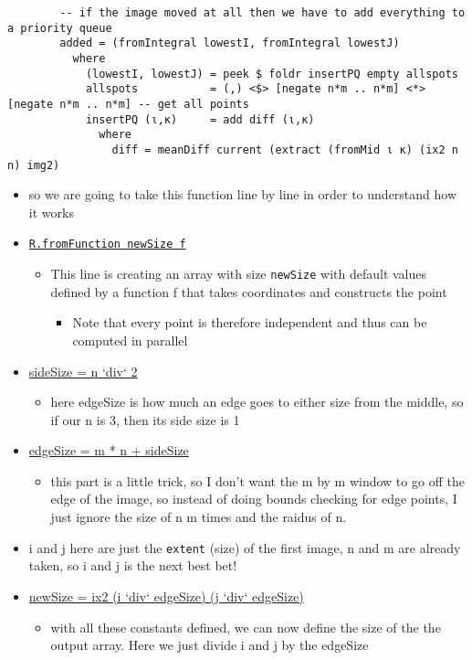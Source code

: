 \documentclass{article}
\begin{document}
\begin{enumerate}
\begin{itemize}
\begin{verbatim}
        -- if the image moved at all then we have to add everything to a priority queue
        added = (fromIntegral lowestI, fromIntegral lowestJ)
          where
            (lowestI, lowestJ) = peek $ foldr insertPQ empty allspots
            allspots           = (,) <$> [negate n*m .. n*m] <*> [negate n*m .. n*m] -- get all points
            insertPQ (ι,κ)     = add diff (ι,κ)
              where
                diff = meanDiff current (extract (fromMid ι κ) (ix2 n n) img2)
\end{verbatim}
\begin{itemize}
\item so we are going to take this function line by line in order to
understand how it works
\item \uline{\texttt{R.fromFunction newSize f}}
\begin{itemize}
\item This line is creating an array with size \texttt{newSize} with default
values defined by a function f that takes coordinates and
constructs the point
\begin{itemize}
\item Note that every point is therefore independent and thus can be
computed in parallel
\end{itemize}
\end{itemize}
\item \uline{sideSize = n `div` 2}
\begin{itemize}
\item here edgeSize is how much an edge goes to either size from the
middle, so if our n is 3, then its side size is 1
\end{itemize}
\item \uline{edgeSize = m * n + sideSize}
\begin{itemize}
\item this part is a little trick, so I don't want the m by m window
to go off the edge of the image, so instead of doing bounds
checking for edge points, I just ignore the size of n m times and
the raidus of n.
\end{itemize}
\item i and j here are just the \texttt{extent} (size) of the first image, n and m
are already taken, so i and j is the next best bet!
\item \uline{newSize = ix2 (i `div` edgeSize) (j `div` edgeSize)}
\begin{itemize}
\item with all these constants defined, we can now define the size of
the the output array. Here we just divide i and j by the edgeSize

\end{itemize}
\end{itemize}
\end{itemize}
\end{enumerate}
\end{document}
